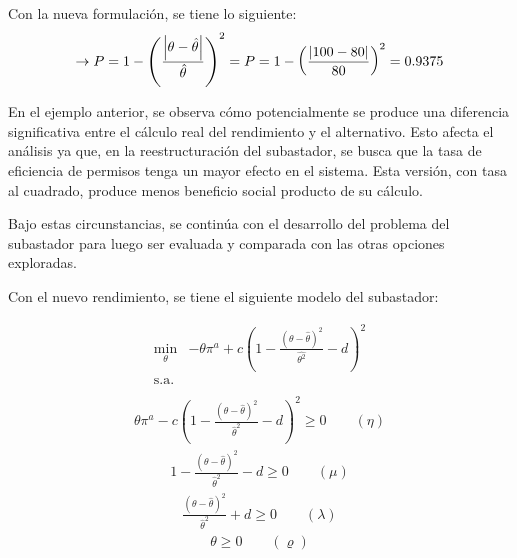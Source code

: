 Con la nueva formulación, se tiene lo siguiente:
$$\rightarrow P= 1 - \left(\frac{\abs{\theta-\hat{\theta}}}{\hat{\theta}}\right)^2=P= 1 - \left(\frac{\abs{100-80}}{80}\right)^2 = 0.9375$$

En el ejemplo anterior, se observa cómo potencialmente se produce una diferencia significativa entre el cálculo real del rendimiento y el alternativo. Esto afecta el análisis ya que, en la reestructuración del subastador, se busca que la tasa de eficiencia de permisos tenga un mayor efecto en el sistema. Esta versión, con tasa al cuadrado, produce menos beneficio social producto de su cálculo.
\vspace{2.5mm}

Bajo estas circunstancias, se continúa con el desarrollo del problema del subastador para luego ser evaluada y comparada con las otras opciones exploradas. 
\vspace{2.5mm}

Con el nuevo rendimiento, se tiene el siguiente modelo del subastador:
\newpage

\begin{equation}
\begin{array}{rrclcl}
\displaystyle \min_{\theta} & -\theta \pi^a + c(1-\frac{(\theta - \hat{\theta})^2}{\hat{\theta^2}}-d)^2 \\\textrm{s.a.} \label{fo:social1}\\
\end{array}
\end{equation}
\begin{equation}
\begin{array}{rrclcl}
\displaystyle \theta \pi^a - c(1-\frac{(\theta - \hat{\theta})^2}{\hat{\theta}^2}-d)^2 \geq 0 \qquad (\eta)\label{social1:r11}
\end{array}
\end{equation}
\begin{equation}
\begin{array}{rrclcl}
1 - \frac{(\theta-\hat{\theta})^2}{\hat{\theta}^2} - d \geq 0 \qquad (\mu) \label{social1:r31}
\end{array}
\end{equation}
\begin{equation}
\begin{array}{rrclcl}
\frac{(\theta-\hat{\theta})^2}{\hat{\theta}^2 }+ d \geq 0 \qquad (\lambda)\label{social1:r41}
\end{array}
\end{equation}
\begin{equation}
\begin{array}{rrclcl}
\theta \geq 0 \qquad (\varrho)\label{social1:r21}
\end{array}
\end{equation}
\vspace{2.5mm}

